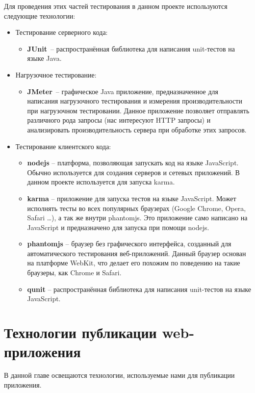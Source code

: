 	Для проведения этих частей тестирования в данном проекте используются следующие технологии:
	\begin{itemize}
\item Тестирование серверного кода:
	\begin{itemize}
		\item \textbf{JUnit}\cite{junit}~-- распространённая библиотека для написания unit-тестов на языке Java.
	\end{itemize}
\item Нагрузочное тестирование:
	\begin{itemize}
		\item \textbf{JMeter}~-- графическое Java приложение, предназначенное для написания нагрузочного тестирования и измерения производительности при нагрузочном тестировании. Данное приложение позволяет отправлять различного рода запросы (нас интересуют HTTP запросы) и анализировать производительность сервера при обработке этих запросов.
	\end{itemize}
\item Тестирование клиентского кода:
\begin{itemize}
	\item \textbf{nodejs}\cite{nodejs} -- платформа, позволяющая запускать код на языке Java\-Script. Обычно используется для создания серверов и сетевых приложений. В данном проекте используется для запуска karma.
	\item \textbf{karma}\cite{karma} -- приложение для запуска тестов на языке JavaScript. Может исполнять тесты во всех популярных браузерах (Google Chro\-me, Opera, Safari \dots), а так же внутри phantomjs. Это приложение само написано на JavaScript и предназначено для запуска при помощи nodejs.
	\item \textbf{phantomjs} -- браузер без графического интерфейса, созданный для автоматического тестирования веб-приложений. Данный браузер основан на платформе WebKit, что делает его похожим по поведению на такие браузеры, как Chrome и Safari.
	\item \textbf{qunit} -- распространённая библиотека для написания unit-тестов на языке JavaScript.
\end{itemize}
\end{itemize}

\section{Технологии публикации web-прило\-же\-ния}
	В данной главе освещаются технологии, используемые нами для публикации приложения.
